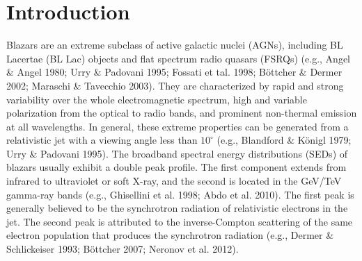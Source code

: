 \documentclass[structabstract]{raa}
\begin{document}

   \maketitle


%
\section{Introduction}           %
\label{sect:intro}

   Blazars are an extreme subclass of active galactic nuclei (AGNs), including BL Lacertae (BL Lac) objects and flat spectrum
   radio quasars (FSRQs) (e.g., Angel \& Angel 1980; Urry \& Padovani 1995; Fossati et tal. 1998; B\"{o}ttcher \& Dermer 2002;
   Maraschi \& Tavecchio 2003). They are characterized by rapid and strong variability over the whole electromagnetic spectrum,
   high and variable polarization from the optical to radio bands, and prominent non-thermal emission at all wavelengths. In general,
   these extreme properties can be generated from a relativistic jet with a viewing angle less than $10^{\circ}$ (e.g., Blandford \&
   K\"{o}nigl 1979; Urry \& Padovani 1995). The broadband spectral energy distributions (SEDs) of blazars usually exhibit a double
   peak profile. The first component extends from infrared to ultraviolet or soft X-ray, and the second is located in the GeV/TeV
   gamma-ray bands (e.g., Ghisellini et al. 1998; Abdo et al. 2010). The first peak is generally believed to be the synchrotron radiation
   of relativistic electrons in the jet. The second peak is attributed to the inverse-Compton scattering of the same electron
   population that produces the synchrotron radiation (e.g., Dermer \& Schlickeiser 1993; B\"{o}ttcher 2007; Neronov et al. 2012).
\end{document}
